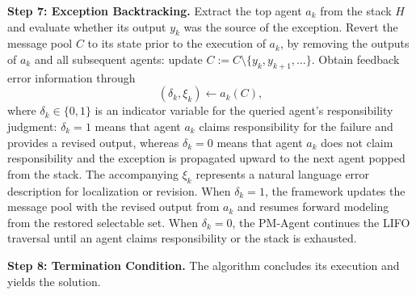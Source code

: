 \documentclass[preprint,12pt]{elsarticle}
\begin{document}
\medskip
\noindent\textbf{Step 7: Exception Backtracking.}
 Extract the top agent $a_k$ from the stack $H$ and evaluate whether its output $y_k$ was the source of the exception. Revert the message pool $C$ to its state prior to the execution of $a_k$, by removing the outputs of $a_k$ and all subsequent agents: update $C:= C\setminus\{y_k,y_{k+1},\ldots\}$.  Obtain feedback error information through
\begin{equation}
\left(\delta_k,\xi_k\right)\gets a_k\left(C\right),
\end{equation}
where $\delta_k\in\{0,1\}$ is an indicator variable for the queried agent's responsibility judgment: $\delta_k=1$ means that agent $a_k$ claims responsibility for the failure and provides a revised output, whereas $\delta_k=0$ means that agent $a_k$ does not claim responsibility and the exception is propagated upward to the next agent popped from the stack. The accompanying $\xi_k$ represents a natural language error description for localization or revision.  When $\delta_k=1$, the framework updates the message pool with the revised output from $a_k$ and resumes forward modeling from the restored selectable set. When $\delta_k=0$, the PM-Agent continues the LIFO traversal until an agent claims responsibility or the stack is exhausted.

\medskip
\noindent\textbf{Step 8: Termination Condition.}
The algorithm concludes its execution and yields the solution.
\end{document}
